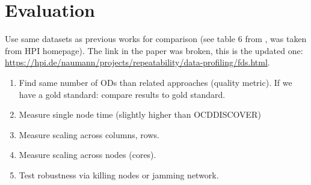 
\section{Evaluation}\label{sec:evaluation}


  Use same datasets as previous works for comparison (see table 6 from \citep{consonni}, was taken from HPI homepage).
  The link in the paper was broken, this is the updated one: \url{https://hpi.de/naumann/projects/repeatability/data-profiling/fds.html}.

  \begin{enumerate}
    \item Find same number of ODs than related approaches (quality metric). If we have a gold standard: compare results to gold standard.
    \item Measure single node time (slightly higher than OCDDISCOVER)
    \item Measure scaling across columns, rows.
    \item Measure scaling across nodes (cores).
    \item Test robustness via killing nodes or jamming network.
  \end{enumerate}
